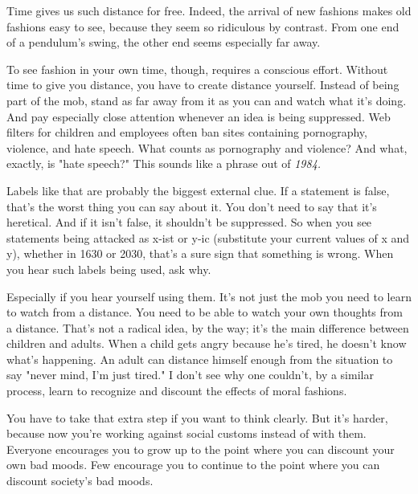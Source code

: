 Time
                  gives us such distance for free. Indeed, the arrival of new
                  fashions makes old fashions easy to see, because they seem so
                  ridiculous by contrast. From one end of a pendulum's swing,
                  the other end seems especially far away.

To see
                  fashion in your own time, though, requires a conscious effort.
                  Without time to give you distance, you have to create distance
                  yourself. Instead of being part of the mob, stand as far away
                  from it as you can and watch what it's doing. And pay
                  especially close attention whenever an idea is being
                  suppressed. Web filters for children and employees often ban
                  sites containing pornography, violence, and hate speech. What
                  counts as pornography and violence? And what, exactly, is
                  "hate speech?" This sounds like a phrase out of \emph{1984.}

Labels like that are probably the biggest
                  external clue. If a statement is false, that's the worst thing
                  you can say about it. You don't need to say that it's
                  heretical. And if it isn't false, it shouldn't be suppressed.
                  So when you see statements being attacked as x-ist or y-ic
                  (substitute your current values of x and y), whether in 1630
                  or 2030, that's a sure sign that something is wrong. When you
                  hear such labels being used, ask why.

Especially if
                  you hear yourself using them. It's not just the mob you need
                  to learn to watch from a distance. You need to be able to
                  watch your own thoughts from a distance. That's not a radical
                  idea, by the way; it's the main difference between children
                  and adults. When a child gets angry because he's tired, he
                  doesn't know what's happening. An adult can distance himself
                  enough from the situation to say "never mind, I'm just tired."
                  I don't see why one couldn't, by a similar process, learn to
                  recognize and discount the effects of moral fashions.

You
                  have to take that extra step if you want to think clearly. But
                  it's harder, because now you're working against social customs
                  instead of with them. Everyone encourages you to grow up to
                  the point where you can discount your own bad moods. Few
                  encourage you to continue to the point where you can discount
                  society's bad moods.

